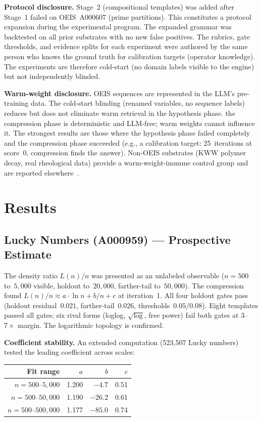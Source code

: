 \documentclass[12pt]{article}
\begin{document}
\textbf{Protocol disclosure.} Stage~2 (compositional templates) was added after Stage~1 failed on OEIS~A000607 (prime partitions). This constitutes a protocol expansion during the experimental program. The expanded grammar was backtested on all prior substrates with no new false positives. The rubrics, gate thresholds, and evidence splits for each experiment were authored by the same person who knows the ground truth for calibration targets (operator knowledge). The experiments are therefore cold-start (no domain labels visible to the engine) but not independently blinded.

\textbf{Warm-weight disclosure.} OEIS sequences are represented in the LLM's pre-training data. The cold-start blinding (renamed variables, no sequence labels) reduces but does not eliminate warm retrieval in the hypothesis phase. the compression phase is deterministic and LLM-free; warm weights cannot influence it. The strongest results are those where the hypothesis phase failed completely and the compression phase succeeded (e.g., a calibration target: 25~iterations at score~0, compression finds the answer). Non-OEIS substrates (KWW polymer decay, real rheological data) provide a warm-weight-immune control group and are reported elsewhere~\cite{kapnistos2008}.

\section{Results}

\subsection{Lucky Numbers (A000959) --- Prospective Estimate}

The density ratio $L(n)/n$ was presented as an unlabeled observable ($n = 500$ to~$5{,}000$ visible, holdout to~$20{,}000$, farther-tail to~$50{,}000$). The compression found $L(n)/n \approx a \cdot \ln n + b/n + c$ at iteration~1. All four holdout gates pass (holdout residual~$0.021$, farther-tail~$0.026$, thresholds~$0.05/0.08$). Eight templates passed all gates; six rival forms (loglog, $\sqrt{\log}$, free power) fail both gates at $3$--$7\times$ margin. The logarithmic topology is confirmed.

\textbf{Coefficient stability.} An extended computation (523{,}507 Lucky numbers) tested the leading coefficient across scales:

\begin{center}
\begin{tabular}{rrrr}
\toprule
Fit range & $a$ & $b$ & $c$ \\
\midrule
$n = 500$--$5{,}000$ & 1.200 & $-4.7$ & 0.51 \\
$n = 500$--$50{,}000$ & 1.190 & $-26.2$ & 0.61 \\
$n = 500$--$500{,}000$ & 1.177 & $-85.0$ & 0.74 \\
\bottomrule
\end{tabular}
\end{center}
\end{document}
